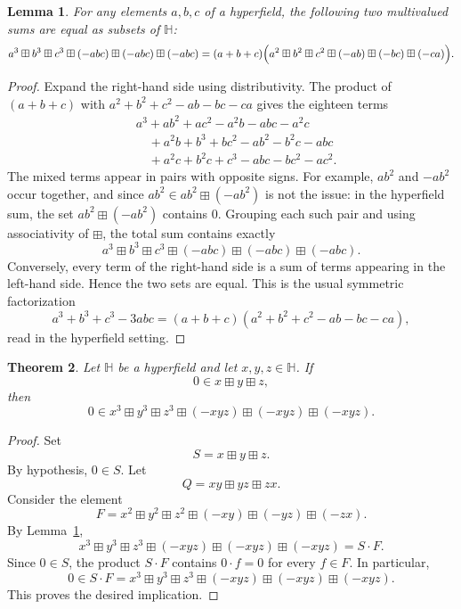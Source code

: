 \documentclass{article}
\newtheorem{theorem}{Theorem}
\newtheorem{lemma}[theorem]{Lemma}
\theoremstyle{definition}
\begin{document}
\begin{lemma}\label{lem:factorization}
For any elements \(a,b,c\) of a hyperfield, the following two multivalued sums are equal
as subsets of \(\mathbb H\):
\[
a^3\boxplus b^3\boxplus c^3\boxplus(-abc)\boxplus(-abc)\boxplus(-abc)
=
(a+b+c)\Bigl(a^2\boxplus b^2\boxplus c^2\boxplus(-ab)\boxplus(-bc)\boxplus(-ca)\Bigr).
\]
\end{lemma}

\begin{proof}
Expand the right-hand side using distributivity. The product of
\((a+b+c)\) with
\(a^2+b^2+c^2-ab-bc-ca\) gives the eighteen terms
\[
\begin{aligned}
& a^3+ab^2+ac^2-a^2b-abc-a^2c\\
&\quad +a^2b+b^3+bc^2-ab^2-b^2c-abc\\
&\quad +a^2c+b^2c+c^3-abc-bc^2-ac^2 .
\end{aligned}
\]
The mixed terms appear in pairs with opposite signs. For example, \(ab^2\) and
\(-ab^2\) occur together, and since \(ab^2\in ab^2\boxplus(-ab^2)\) is not the issue:
in the hyperfield sum, the set \(ab^2\boxplus(-ab^2)\) contains \(0\). Grouping each
such pair and using associativity of \(\boxplus\), the total sum contains exactly
\[
a^3\boxplus b^3\boxplus c^3\boxplus(-abc)\boxplus(-abc)\boxplus(-abc).
\]
Conversely, every term of the right-hand side is a sum of terms appearing in the
left-hand side. Hence the two sets are equal. This is the usual symmetric
factorization
\[
a^3+b^3+c^3-3abc=(a+b+c)(a^2+b^2+c^2-ab-bc-ca),
\]
read in the hyperfield setting.
\end{proof}

\begin{theorem}\label{thm:main}
Let \(\mathbb H\) be a hyperfield and let \(x,y,z\in\mathbb H\). If
\[
0\in x\boxplus y\boxplus z,
\]
then
\[
0\in x^3\boxplus y^3\boxplus z^3\boxplus(-xyz)\boxplus(-xyz)\boxplus(-xyz).
\]
\end{theorem}

\begin{proof}
Set
\[
S=x\boxplus y\boxplus z.
\]
By hypothesis, \(0\in S\). Let
\[
Q=xy\boxplus yz\boxplus zx.
\]
Consider the element
\[
F=x^2\boxplus y^2\boxplus z^2\boxplus(-xy)\boxplus(-yz)\boxplus(-zx).
\]
By Lemma~\ref{lem:factorization},
\[
x^3\boxplus y^3\boxplus z^3\boxplus(-xyz)\boxplus(-xyz)\boxplus(-xyz)
=
S\cdot F.
\]
Since \(0\in S\), the product \(S\cdot F\) contains \(0\cdot f=0\) for every
\(f\in F\). In particular,
\[
0\in S\cdot F
=
x^3\boxplus y^3\boxplus z^3\boxplus(-xyz)\boxplus(-xyz)\boxplus(-xyz).
\]
This proves the desired implication.
\end{proof}
\end{document}
